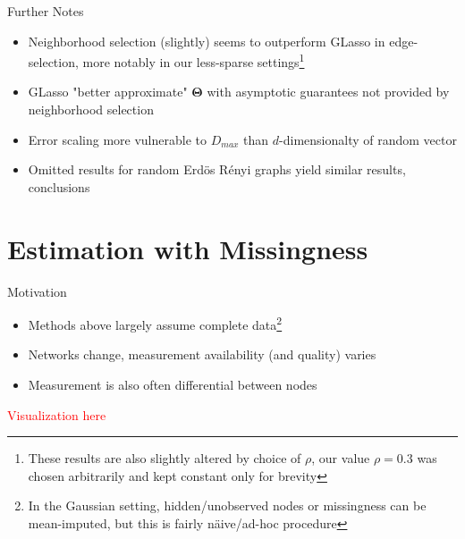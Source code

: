 \documentclass{beamer}
\begin{document}
\begin{frame}{Further Notes}
\begin{itemize}\setlength\itemsep{5mm}
    \item Neighborhood selection (slightly) seems to outperform GLasso in edge-selection, more notably in our less-sparse settings\footnote{These results are also slightly altered by choice of $\rho$, our value $\rho=0.3$ was chosen arbitrarily and kept constant only for brevity}
    \item GLasso "better approximate" $\boldsymbol\Theta$ with asymptotic guarantees not provided by neighborhood selection
    \item Error scaling more vulnerable to $D_{max}$ than $d$-dimensionalty of random vector 
    \item Omitted results for random Erd\"os R\'enyi graphs yield similar results, conclusions 
\end{itemize}    
\end{frame}


\section{Estimation with Missingness}

\begin{frame}{Motivation}
    \begin{itemize}
        \item Methods above largely assume complete data\footnote{In the Gaussian setting, hidden/unobserved nodes or missingness can be mean-imputed, but this is fairly n\"aive/ad-hoc procedure}
        \item Networks change, measurement availability (and quality) varies
        \item Measurement is also often differential between nodes 
    \end{itemize}
    \textcolor{red}{Visualization here}
\end{frame}
\end{document}
